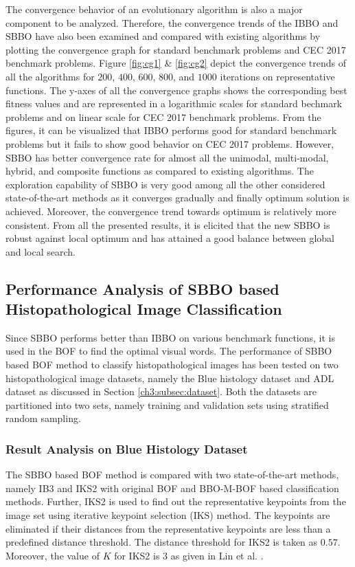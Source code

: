 The convergence behavior of an evolutionary algorithm is also a major component to be analyzed. Therefore, the convergence trends of the IBBO and SBBO have also been examined and compared with existing algorithms by plotting the convergence graph for standard benchmark problems and CEC 2017 benchmark problems.  Figure \ref{fig:cg1} \& \ref{fig:cg2} depict the convergence trends of all the algorithms for $200$, $400$, $600$, $800$, and $1000$ iterations on representative functions. The y-axes of all the convergence graphs shows the corresponding best fitness values and are represented in a logarithmic scales for standard bechmark problems and on linear scale for CEC 2017 benchmark problems. From the figures, it can be visualized that IBBO performs good for standard benchmark problems but it fails to show good behavior on CEC 2017 problems. However, SBBO has better convergence rate for almost all the unimodal, multi-modal, hybrid, and composite functions as compared to existing algorithms.  The exploration capability of SBBO is very good among all the other considered state-of-the-art methods as it converges gradually and finally optimum solution is achieved. Moreover, the convergence trend towards optimum is relatively more consistent. From all the presented results, it is elicited that the new SBBO is robust against local optimum and has attained a good balance between global and local search.


 
\subsection{Performance Analysis of SBBO based Histopathological Image Classification} \label{ch4:subsec:results2}
Since SBBO performs better than IBBO on various benchmark functions, it is used in the BOF to find the optimal visual words. The performance of SBBO based BOF method to classify histopathological images has been tested on two histopathological image datasets, namely the Blue histology dataset and ADL dataset as discussed in Section \ref{ch3:subsec:dataset}. Both the datasets are partitioned into two sets, namely training and validation sets using stratified random sampling. 

\subsubsection{Result Analysis on Blue Histology Dataset}
 The SBBO based BOF method is compared with two state-of-the-art methods, namely IB3 \cite{aha1991} and IKS2 \cite{lin2016} with original BOF \cite{caicedo2009} and BBO-M-BOF based classification methods. 
Further, IKS2 is used to find out the representative keypoints from the image set using iterative keypoint selection (IKS) method. The keypoints are eliminated if their distances from the representative keypoints are less than a predefined distance threshold. The distance threshold for IKS2 is taken as $0.57$. Moreover, the value of $K$ for IKS2 is $3$ as given in Lin et al.  \cite{lin2016}. 

